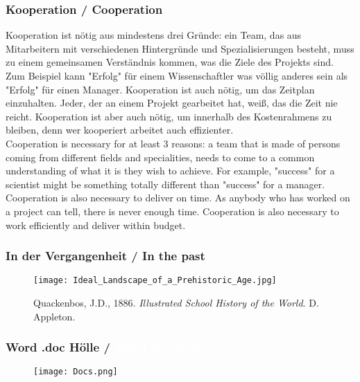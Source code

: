 {\scriptsize
\begin{frame}
  \frametitle{Kooperation / \textcolor{mfn_green}{Cooperation}}
  Kooperation ist nötig aus mindestens drei Gründe: ein Team, das aus Mitarbeitern mit verschiedenen Hintergründe und Spezialisierungen besteht, muss zu einem gemeinsamen Verständnis kommen, was die Ziele des Projekts sind. Zum Beispiel kann "Erfolg" für einem Wissenschaftler was völlig anderes sein als "Erfolg" für einen Manager. Kooperation ist auch nötig, um das Zeitplan einzuhalten. Jeder, der an einem Projekt gearbeitet hat, weiß, das die Zeit nie reicht. Kooperation ist aber auch nötig, um innerhalb des Kostenrahmens zu bleiben, denn wer kooperiert arbeitet auch effizienter.\\
  \bigskip
  \textcolor{mfn_green}{Cooperation is necessary for at least 3 reasons: a team that is made of persons coming from different fields and specialities, needs to come to a common understanding of what it is they wish to achieve. For example, "success" for a scientist might be something totally different than "success" for a manager. Cooperation is also necessary to deliver on time. As anybody who has worked on a project can tell, there is never enough time. Cooperation is also necessary to work efficiently and deliver within budget.}
\end{frame}
}
%
%

\begin{frame}
  \frametitle{In der Vergangenheit / \textcolor{mfn_green}{In the past}}
  \begin{figure}
    \texttt{[image: Ideal\_Landscape\_of\_a\_Prehistoric\_Age.jpg]}
    \caption{Quackenbos, J.D., 1886. \textit{Illustrated School History of the World}. D. Appleton.}
  \end{figure}
\end{frame}

{
\begin{frame}
  \frametitle{Word\textsuperscript{\tiny\textregistered} .doc Hölle /
    \textcolor{white}{Word\textsuperscript{\tiny\textregistered} .doc hell}}
  \begin{figure}
  \texttt{[image: Docs.png]}
  \end{figure}
\end{frame}
}

